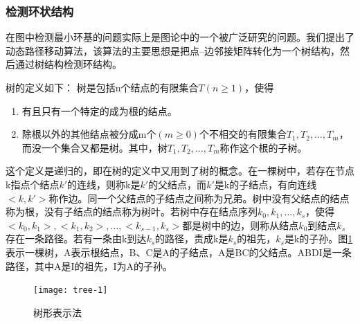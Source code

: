 \subsubsection{检测环状结构}
\label{}


在图中检测最小环基的问题实际上是图论中的一个被广泛研究的问题。我们提出了动态路径移动算法，该算法的主要思想是把点--边邻接矩阵转化为一个树结构，然后通过树结构检测环结构。

树的定义如下：
树是包括n个结点的有限集合$T(n \geq 1)$\cite{zhangming}，使得
\begin{enumerate}
\item 有且只有一个特定的成为根的结点。
\item 除根以外的其他结点被分成m个$(m \geq 0)$个不相交的有限集合$T_1, T_2, \ldots, T_m$，而没一个集合又都是树。其中，树$T_1, T_2, \ldots, T_m$称作这个根的子树。
\end{enumerate}

这个定义是递归的，即在树的定义中又用到了树的概念。在一棵树中，若存在节点k指点个结点$k'$的连线，则称k是$k'$的父结点，而$k'$是k的子结点，有向连线$<k, k'>$称作边。同一个父结点的子结点之间称为兄弟。树中没有父结点的结点称为根，没有子结点的结点称为树叶。若树中存在结点序列$k_0,k_1,\ldots,k_s$，使得$<k_0,k_1>,<k_1,k_2>,\ldots,<k_{s-1},k_s>$都是树中的边，则称从结点$k_0$到结点$k_s$存在一条路径。若有一条由k到达$k_s$的路径，责成k是$k_s$的祖先，$k_s$是k的子孙。图\ref{fig:tree}表示一棵树，A表示根结点，B、C是A的子结点，A是BC的父结点。ABDI是一条路径，其中A是I的祖先，I为A的子孙。

\begin{figure}[!ht]
\centering
\texttt{[image: tree-1]}
\caption{树形表示法}
\label{fig:tree}
\end{figure}


